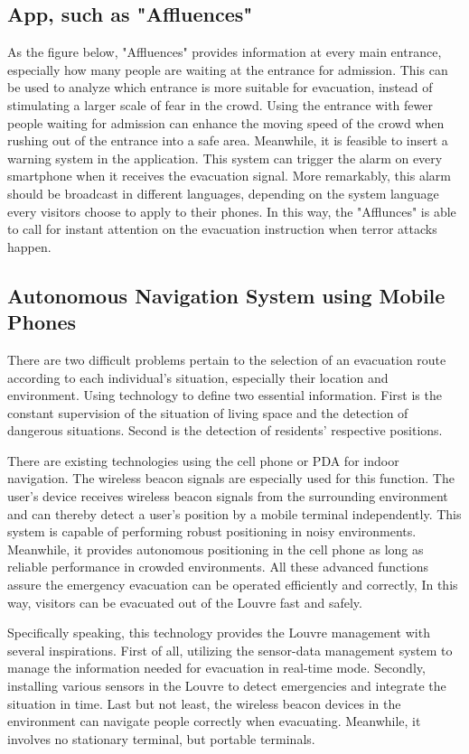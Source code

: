 \documentclass{mcmthesis}
\begin{document}
	\subsection{App, such as "Affluences"}
	As the figure below, "Affluences" provides information at every main entrance, especially how many people are waiting at the entrance for admission.  This can be used to analyze which entrance is more suitable for evacuation, instead of stimulating a larger scale of fear in the crowd. Using the entrance with fewer people waiting for admission can enhance the moving speed of the crowd when rushing out of the entrance into a safe area.
	Meanwhile, it is feasible to insert a warning system in the application. This system can trigger the alarm on every smartphone when it receives the evacuation signal. More remarkably, this alarm should be broadcast in different languages, depending on the system language every visitors choose to apply to their phones. In this way, the "Afflunces" is able to call for instant attention on the evacuation instruction when terror attacks happen.
	
	\subsection{Autonomous Navigation System using Mobile Phones}
	
	There are two difficult problems pertain to the selection of an evacuation route according to each individual's situation, especially their location and environment. Using technology to define two essential information. First is the constant supervision of the situation of living space and the detection of dangerous situations. Second is the detection of residents' respective positions.
	
	There are existing technologies using the cell phone or PDA for indoor navigation. The wireless beacon signals are especially used for this function. The user's device receives wireless beacon signals from the surrounding environment and can thereby detect a user's position by a mobile terminal independently. This system is capable of performing robust positioning in noisy environments. Meanwhile, it provides autonomous positioning in the cell phone as long as reliable performance in crowded environments. All these advanced functions assure the emergency evacuation can be operated efficiently and correctly, In this way, visitors can be evacuated out of the Louvre fast and safely.
	
	Specifically speaking, this technology provides the Louvre management with several inspirations. First of all, utilizing the sensor-data management system to manage the information needed for evacuation in real-time mode. Secondly, installing various sensors in the Louvre to detect emergencies and integrate the situation in time. Last but not least, the wireless beacon devices in the environment can navigate people correctly when evacuating. Meanwhile, it involves no stationary terminal, but portable terminals.
	
\end{document}
